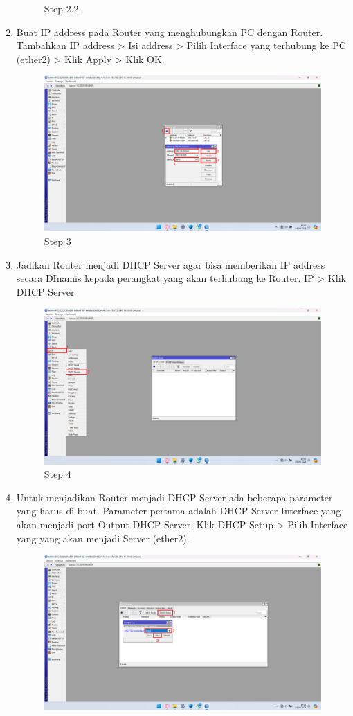 \begin{center}
\begin{enumerate}
\begin{figure}[H]
			\caption{Step 2.2}
			\label{fig:Step 2.2}
		\end{figure}
        \item Buat IP address pada Router yang menghubungkan PC dengan Router. Tambahkan IP address > Isi address > Pilih Interface yang terhubung ke PC (ether2) > Klik Apply > Klik OK.
        \begin{figure}[H]
			\centering
			\includegraphics[width=0.8\linewidth]{P3/img/Step 3.png}
			\caption{Step 3}
			\label{fig:Step 3}
		\end{figure}
        \item Jadikan Router menjadi DHCP Server agar bisa memberikan IP address secara DInamis kepada perangkat yang akan terhubung ke Router. IP > Klik DHCP Server
        \begin{figure}[H]
			\centering
			\includegraphics[width=0.8\linewidth]{P3/img/Step 4.png}
			\caption{Step 4}
			\label{fig:Step 4}
		\end{figure}
        \item Untuk menjadikan Router menjadi DHCP Server ada beberapa parameter yang harus di buat. Parameter pertama adalah DHCP Server Interface yang akan menjadi port Output DHCP Server. Klik DHCP Setup > Pilih Interface yang yang akan menjadi Server (ether2).
        \begin{figure}[H]
			\centering
			\includegraphics[width=0.8\linewidth]{P3/img/Step 5.png}

\end{figure}
\end{enumerate}
\end{center}
